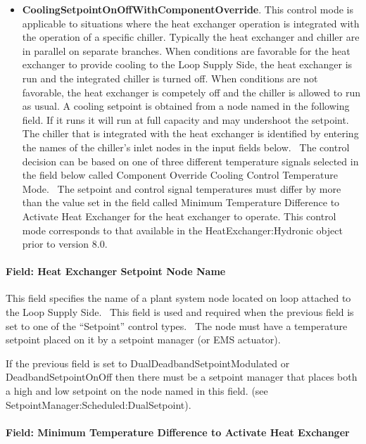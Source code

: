 \begin{itemize}
\item
  \textbf{CoolingSetpointOnOffWithComponentOverride}.  This control mode is applicable to situations where the heat exchanger operation is integrated with the operation of a specific chiller.  Typically the heat exchanger and chiller are in parallel on separate branches.  When conditions are favorable for the heat exchanger to provide cooling to the Loop Supply Side, the heat exchanger is run and the integrated chiller is turned off.  When conditions are not favorable, the heat exchanger is competely off and the chiller is allowed to run as usual.  A cooling setpoint is obtained from a node named in the following field.  If it runs it will run at full capacity and may undershoot the setpoint.  The chiller that is integrated with the heat exchanger is identified by entering the names of the chiller's inlet nodes in the input fields below.~ The control decision can be based on one of three different temperature signals selected in the field below called Component Override Cooling Control Temperature Mode.~ The setpoint and control signal temperatures must differ by more than the value set in the field called Minimum Temperature Difference to Activate Heat Exchanger for the heat exchanger to operate. This control mode corresponds to that available in the HeatExchanger:Hydronic object prior to version 8.0.
\end{itemize}

\paragraph{Field: Heat Exchanger Setpoint Node Name}\label{field-heat-exchanger-setpoint-node-name}

This field specifies the name of a plant system node located on loop attached to the Loop Supply Side.~ This field is used and required when the previous field is set to one of the ``Setpoint'' control types.~ The node must have a temperature setpoint placed on it by a setpoint manager (or EMS actuator).

If the previous field is set to DualDeadbandSetpointModulated or DeadbandSetpointOnOff then there must be a setpoint manager that places both a high and low setpoint on the node named in this field. (see SetpointManager:Scheduled:DualSetpoint).

\paragraph{Field: Minimum Temperature Difference to Activate Heat Exchanger}\label{field-minimum-temperature-difference-to-activate-heat-exchanger}

